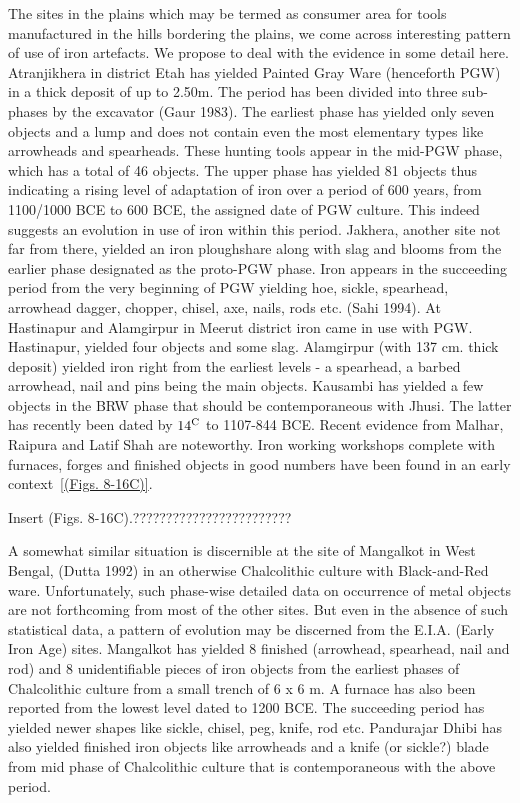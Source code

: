The sites in the plains which may be termed as consumer area for tools manufactured in the hills bordering the plains, we come across interesting pattern of use of iron artefacts. We propose to deal with the evidence in some detail here. Atranjikhera in district Etah has yielded Painted Gray Ware (henceforth PGW) in a thick deposit of up to 2.50m. The period has been divided into three sub-phases by the excavator (Gaur 1983). The earliest phase has yielded only seven objects and a lump and does not contain even the most elementary types like arrowheads and spearheads. These hunting tools appear in the mid-PGW phase, which has a total of 46 objects. The upper phase has yielded 81 objects thus indicating a rising level of adaptation of iron over a period of 600 years, from 1100/1000 BCE to 600 BCE, the assigned date of PGW culture. This indeed suggests an evolution in use of iron within this period. Jakhera, another site not far from there, yielded an iron ploughshare along with slag and blooms from the earlier phase designated as the proto-PGW phase. Iron appears in the succeeding period from the very beginning of PGW yielding hoe, sickle, spearhead, arrowhead dagger, chopper, chisel, axe, nails, rods etc. (Sahi 1994). At Hastinapur and Alamgirpur in Meerut district iron came in use with PGW. Hastinapur, yielded four objects and some slag. Alamgirpur (with 137 cm. thick deposit) yielded iron right from the earliest levels - a spearhead, a barbed arrowhead, nail and pins being the main objects. Kausambi has yielded a few objects in the BRW phase that should be contemporaneous with Jhusi. The latter has recently been dated by $14^{\rm C}$ to 1107-844 BCE. Recent evidence from Malhar, Raipura and Latif Shah are noteworthy. Iron working workshops complete with furnaces, forges and finished objects in good numbers have been found in an early context~\ref{(Figs. 8-16C)}.


Insert (Figs. 8-16C).????????????????????????

 A somewhat similar situation is discernible at the site of Mangalkot in West Bengal, (Dutta 1992) in an otherwise Chalcolithic culture with Black-and-Red ware. Unfortunately, such phase-wise detailed data on occurrence of metal objects are not forthcoming from most of the other sites. But even in the absence of such statistical data, a pattern of evolution may be discerned from the E.I.A. (Early Iron Age) sites. Mangalkot has yielded 8 finished (arrowhead, spearhead, nail and rod) and 8 unidentifiable pieces of iron objects from the earliest phases of Chalcolithic culture from a small trench of 6 x 6 m. A furnace has also been reported from the lowest level dated to 1200 BCE. The succeeding period has yielded newer shapes like sickle, chisel, peg, knife, rod etc. Pandurajar Dhibi has also yielded finished iron objects like arrowheads and a knife (or sickle?) blade from mid phase of Chalcolithic culture that is contemporaneous with the above period.

